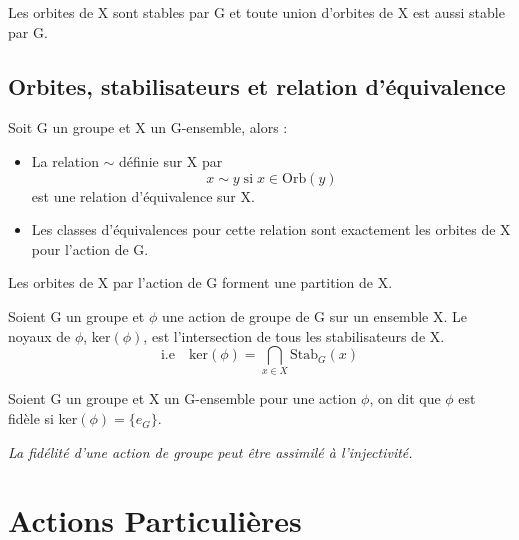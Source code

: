 \begin{prop}
	Les orbites de X sont stables par G et toute union d'orbites de X est aussi stable par G. 
\end{prop}

\subsection{Orbites, stabilisateurs et relation d'équivalence}

\begin{proposition}
	Soit G un groupe et X un G-ensemble, alors :
	\begin{itemize}
		\item La relation $\sim$ définie sur X par 
			\[ x \sim y \; \text{si} \; x \in \text{Orb}(y) \] 
		est une relation d'équivalence sur X. 
		\item Les classes d'équivalences pour cette relation sont exactement les orbites de X pour l'action de G.
	\end{itemize}
\end{proposition}

\begin{prop}
	Les orbites de X par l'action de G forment une partition de X.
\end{prop}

\begin{prop}[Noyaux]
	Soient G un groupe et $\phi$ une action de groupe de G sur un ensemble X. 
	Le noyaux de $\phi$, ker$(\phi)$, est l'intersection de tous les stabilisateurs de X. 
	\[ \boxed{ \text{i.e} \quad \text{ker}(\phi) = \bigcap_{x \in X} \text{Stab}_G(x) }\] 
\end{prop}

\begin{definition}
	Soient G un groupe et X un G-ensemble pour une action $\phi$, on dit que $\phi$ est fidèle si ker$(\phi) = \{ e_G\}$. 

	\vspace{0.5cm}

	\emph{La fidélité d'une action de groupe peut être assimilé à l'injectivité.}
	
\end{definition}


\section{Actions Particulières}
